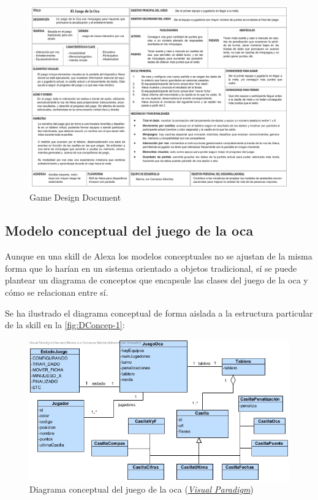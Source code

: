 \begin{figure}[H]
	\centering
	\includegraphics[width=1\textwidth]{imgs/GDD-imagen.jpg}
	\caption{Game Design Document}
	\label{fig:GDD-imagen}
\end{figure}

\subsection{Modelo conceptual del juego de la oca}

Aunque en una skill de Alexa los modelos conceptuales no se ajustan de la misma forma que lo harían en un sistema orientado a objetos tradicional, sí se puede plantear un diagrama de conceptos que encapsule las clases del juego de la oca y cómo se relacionan entre sí.

Se ha ilustrado el diagrama conceptual de forma aislada a la estructura particular de la skill en la \autoref{fig:DConcep-1}:

\vline
\begin{figure}[H]
	\centering
	\includegraphics[width=1\textwidth]{imgs/DConcep.jpg}
	\caption{Diagrama conceptual del juego de la oca (\href{https://www.visual-paradigm.com/}{\textit{Visual Paradigm}})}
	\label{fig:DConcep-1}
\end{figure}

